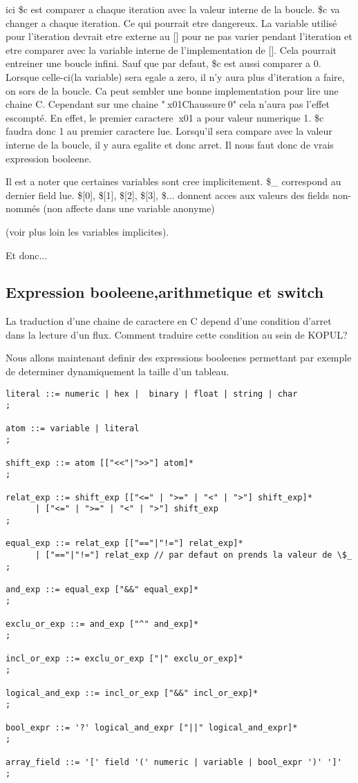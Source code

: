\documentclass[11pt]{report}
\begin{document}
ici \$c est comparer a chaque iteration avec la valeur interne de la boucle. 
\$c va changer a chaque iteration. 
Ce qui pourrait etre dangereux. 
La variable utilisé pour l'iteration devrait etre externe au [] pour ne pas varier pendant l'iteration 
et etre comparer avec la variable interne de l'implementation de []. 
Cela pourrait entreiner une boucle infini. 
Sauf que par defaut, \$c est aussi comparer a 0. 
Lorsque celle-ci(la variable) sera egale a zero, il n'y aura plus d'iteration a faire, on sors de la boucle.
Ca peut sembler une bonne implementation pour lire une chaine C.
Cependant sur une chaine "$\ $x01Chaussure$\ $0" cela n'aura pas l'effet escompté. 
En effet, le premier caractere $\ $x01 a pour valeur numerique 1.
\$c faudra donc 1 au premier caractere lue. 
Lorsqu'il sera compare avec la valeur interne de la boucle, il y aura egalite et donc arret.
Il nous faut donc de vrais expression booleene.

Il est a noter que certaines variables sont cree implicitement.
\$\_ correspond au dernier field lue.
\$[0], \$[1], \$[2], \$[3], \$... donnent acces aux valeurs des fields non-nommés (non affecte dans une variable anonyme)

(voir plus loin les variables implicites).

Et donc...

\subsection{Expression booleene,arithmetique et switch}
La traduction d'une chaine de caractere en C depend d'une condition d'arret dans la lecture d'un flux. 
Comment traduire cette condition au sein de KOPUL?

Nous allons maintenant definir des expressions booleenes permettant par exemple de determiner dynamiquement la taille d'un tableau.

\begin{lstlisting}
literal ::= numeric | hex |  binary | float | string | char
;

atom ::= variable | literal
;

shift_exp ::= atom [["<<"|">>"] atom]*
;

relat_exp ::= shift_exp [["<=" | ">=" | "<" | ">"] shift_exp]*
	  | ["<=" | ">=" | "<" | ">"] shift_exp
;

equal_exp ::= relat_exp [["=="|"!="] relat_exp]*
	  | ["=="|"!="] relat_exp // par defaut on prends la valeur de \$_
;

and_exp ::= equal_exp ["&&" equal_exp]*
;

exclu_or_exp ::= and_exp ["^" and_exp]*
;

incl_or_exp ::= exclu_or_exp ["|" exclu_or_exp]*
;

logical_and_exp ::= incl_or_exp ["&&" incl_or_exp]*
;

bool_expr ::= '?' logical_and_expr ["||" logical_and_expr]*
;

array_field ::= '[' field '(' numeric | variable | bool_expr ')' ']'
;
\end{lstlisting}
\end{document}
